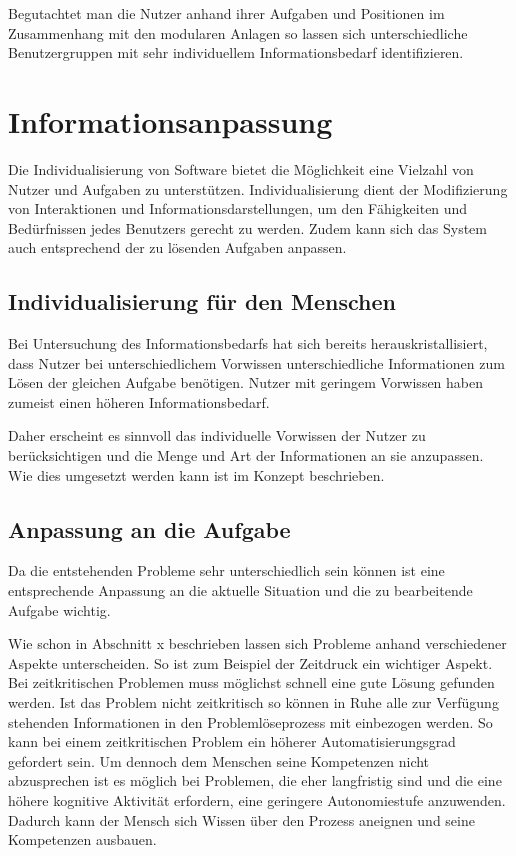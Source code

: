 Begutachtet man die Nutzer anhand ihrer Aufgaben und Positionen im Zusammenhang mit den modularen Anlagen so lassen sich unterschiedliche Benutzergruppen mit sehr individuellem Informationsbedarf identifizieren. 


\section{Informationsanpassung}
Die Individualisierung von Software bietet die Möglichkeit eine Vielzahl von Nutzer und Aufgaben zu unterstützen. Individualisierung dient der Modifizierung von Interaktionen und Informationsdarstellungen, um den Fähigkeiten und Bedürfnissen jedes Benutzers gerecht zu werden. Zudem kann sich das System auch entsprechend der zu lösenden Aufgaben anpassen.

\subsection{Individualisierung für den Menschen}
Bei Untersuchung des Informationsbedarfs hat sich bereits herauskristallisiert, dass Nutzer bei unterschiedlichem Vorwissen unterschiedliche Informationen zum Lösen der gleichen Aufgabe benötigen. Nutzer mit geringem Vorwissen haben zumeist einen höheren Informationsbedarf.

Daher erscheint es sinnvoll das individuelle Vorwissen der Nutzer zu berücksichtigen und die Menge und Art der Informationen an sie anzupassen. Wie dies umgesetzt werden kann ist im Konzept beschrieben.

\subsection{Anpassung an die Aufgabe}
Da die entstehenden Probleme sehr unterschiedlich sein können ist eine entsprechende Anpassung an die aktuelle Situation und die zu bearbeitende Aufgabe wichtig.

Wie schon in Abschnitt x beschrieben lassen sich Probleme anhand verschiedener Aspekte unterscheiden. So ist zum Beispiel der Zeitdruck ein wichtiger Aspekt. Bei zeitkritischen Problemen muss möglichst schnell eine gute Lösung gefunden werden. Ist das Problem nicht zeitkritisch so können in Ruhe alle zur Verfügung stehenden Informationen in den Problemlöseprozess mit einbezogen werden. So kann bei einem zeitkritischen Problem ein höherer Automatisierungsgrad gefordert sein. Um dennoch dem Menschen seine Kompetenzen nicht abzusprechen ist es möglich bei Problemen, die eher langfristig sind und die eine höhere kognitive Aktivität erfordern, eine geringere Autonomiestufe anzuwenden. Dadurch kann der Mensch sich Wissen über den Prozess aneignen und seine Kompetenzen ausbauen. 

